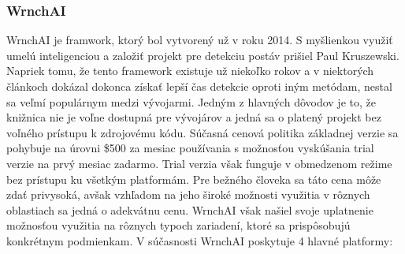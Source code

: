 \documentclass[slovak,master,dept460,male,cpp,cpdeclaration]{diploma}
\begin{document}
\subsubsection{WrnchAI}
WrnchAI je framwork, ktorý bol vytvorený už v roku 2014. S myšlienkou využiť umelú inteligenciou a založiť projekt pre detekciu postáv prišiel Paul Kruszewski. Napriek tomu, že tento framework  existuje už niekoľko rokov a v niektorých článkoch\cite{openposeVsWrnchAI} dokázal dokonca získať lepší čas detekcie oproti iným metódam,  nestal sa veľmí populárnym medzi vývojarmi. Jedným z hlavných dôvodov je to, že knižnica nie je voľne dostupná pre vývojárov a jedná sa o platený projekt bez voľného prístupu k zdrojovému kódu. Súčasná cenová politika základnej verzie sa pohybuje na úrovni \$500 za mesiac používania s možnosťou vyskúšania trial verzie na prvý mesiac zadarmo. Trial verzia však funguje v obmedzenom režime  bez prístupu ku všetkým platformám. Pre bežného človeka sa táto cena môže zdať privysoká, avšak vzhľadom na jeho široké možnosti využitia  v rôznych oblastiach sa jedná o adekvátnu cenu. WrnchAI však našiel svoje uplatnenie možnosťou využitia na rôznych typoch zariadení, ktoré sa prispôsobujú konkrétnym podmienkam. V súčasnosti WrnchAI poskytuje 4 hlavné platformy:
\end{document}
